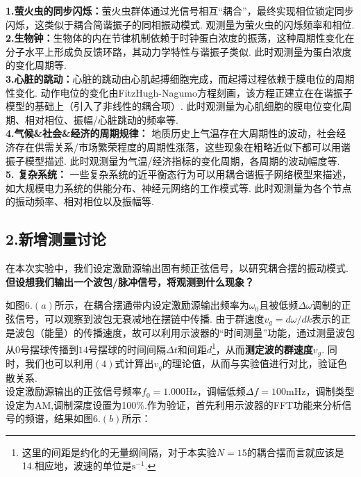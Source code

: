 \documentclass{ctexart}
\begin{document}
\noindent \textbf{1.萤火虫的同步闪烁：}萤火虫群体通过光信号相互“耦合”，最终实现相位锁定同步闪烁，这类似于耦合简谐振子的同相振动模式. 观测量为萤火虫的闪烁频率和相位.\\

\noindent \textbf{2.生物钟：}生物体的内在节律机制依赖于时钟蛋白浓度的振荡，这种周期性变化在分子水平上形成负反馈环路，其动力学特性与谐振子类似. 此时观测量为蛋白浓度的变化周期等.\\

\noindent \textbf{3.心脏的跳动：}心脏的跳动由心肌起搏细胞完成，而起搏过程依赖于膜电位的周期性变化. 动作电位的变化由FitzHugh-Nagumo方程刻画，该方程正建立在在谐振子模型的基础上（引入了非线性的耦合项）. 此时观测量为心肌细胞的膜电位变化周期、相对相位、振幅/心脏跳动的频率等.\\

\noindent \textbf{4.气候\&社会\&经济的周期规律：} 地质历史上气温存在大周期性的波动，社会经济存在供需关系/市场繁荣程度的周期性涨落，这些现象在粗略近似下都可以用谐振子模型描述. 此时观测量为气温/经济指标的变化周期，各周期的波动幅度等.\\

\noindent \textbf{5. 复杂系统：} 一些复杂系统的近平衡态行为可以用耦合谐振子网络模型来描述，如大规模电力系统的供能分布、神经元网络的工作模式等. 此时观测量为各个节点的振动频率、相对相位以及振幅等.\\

\subsection*{2.\quad 新增测量讨论}
在本次实验中，我们设定激励源输出固有频正弦信号，以研究耦合摆的振动模式. \textbf{但设想我们输出一个波包/脉冲信号，将观测到什么现象？}

如图$6.(a)$所示，在耦合摆通带内设定激励源输出频率为$\omega_0$且被低频$\Delta \omega$调制的正弦信号，可以观察到波包无衰减地在摆链中传播. 由于群速度$v_g=d\omega/dk$表示的正是波包（能量）的传播速度，故可以利用示波器的“时间测量”功能，通过测量波包从$0$号摆球传播到$14$号摆球的时间间隔$\Delta t$和间距$d$\footnote{这里的间距是约化的无量纲间隔，对于本实验$N=15$的耦合摆而言就应该是14.相应地，波速的单位是$\mathrm{s^{-1}.}$}，从而\textbf{测定波的群速度$v_g$}. 同时，我们也可以利用$(4)$式计算出$v_g$的理论值，从而与实验值进行对比，验证色散关系.\\

设定激励源输出的正弦信号频率$f_0=1.000\mathrm{Hz}$，调幅低频$\Delta f=100\mathrm{mHz}$，调制类型设定为AM,调制深度设置为100\%.作为验证，首先利用示波器的FFT功能来分析信号的频谱，结果如图$6.(b)$所示：\\ 
\end{document}
